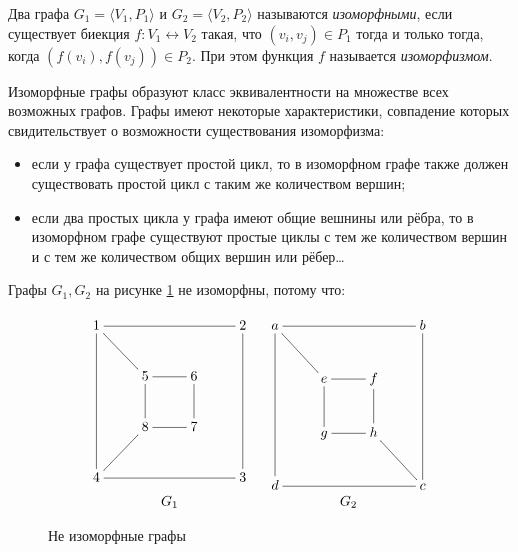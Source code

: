 Два графа $G_1=\langle V_1,P_1\rangle$ и $G_2=\langle V_2,P_2\rangle$ называются \emph{изоморфными}, если существует биекция $f:V_1\leftrightarrow V_2$ такая, что $(v_i,v_j)\in P_1$ тогда и только тогда, когда $(f(v_i),f(v_j))\in P_2$. При этом функция $f$ называется \emph{изоморфизмом}.

Изоморфные графы образуют класс эквивалентности на множестве всех возможных графов. Графы имеют некоторые характеристики, совпадение которых свидительствует о возможности существования изоморфизма:
\begin{itemize}
    \item если у графа существует простой цикл, то в изоморфном графе также должен существовать простой цикл с таким же количеством вершин;
    \item если два простых цикла у графа имеют общие вешнины или рёбра, то в изоморфном графе существуют простые циклы с тем же количеством вершин и с тем же количеством общих вершин или рёбер\ldots
\end{itemize}

Графы $G_1,G_2$ на рисунке \ref{fig:graph:nonIzomorphic8} не изоморфны, потому что:
\begin{figure}
    \[
        \begin{tabular}{cc}
        {\xymatrix{
            1 \ar@{-}[rrr] \ar@{-}[ddd] \ar@{-}[dr]
                &*{}
                    &*{}
                        &2 \ar@{-}[ddd]
                            \\
            *{}
                &5 \ar@{-}[r] \ar@{-}[d]
                    &6 \ar@{-}[d]
                        &*{}
                            \\
            *{}
                &8 \ar@{-}[r]
                    &7
                        &*{}
                            \\
            4 \ar@{-}[ur]
                &*{}
                    &*{}
                        &3 \ar@{-}[lll]
        }}
        &
        {\xymatrix{
            a \ar@{-}[rrr] \ar@{-}[ddd] \ar@{-}[dr]
                &*{}
                    &*{}
                        &b \ar@{-}[ddd]
                            \\
            *{}
                &e \ar@{-}[r] \ar@{-}[d]
                    &f \ar@{-}[d]
                        &*{}
                            \\
            *{}
                &g \ar@{-}[r]
                    &h\ar@{-}[dr]
                        &*{}
                            \\
            d 
                &*{}
                    &*{}
                        &c \ar@{-}[lll]
        }}
        \\
        $G_1$&$G_2$
        \end{tabular}
    \]
    \caption{Не изоморфные графы}
    \label{fig:graph:nonIzomorphic8}
\end{figure}

